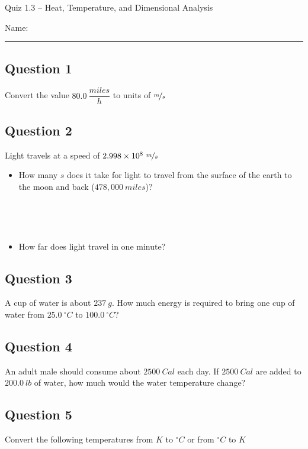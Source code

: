 \documentclass[11pt, letterpaper]{memoir}
\begin{document}
	\begin{center}
		{\large Quiz 1.3 --	Heat, Temperature, and Dimensional Analysis}
	\end{center}
	{\large Name: \rule[-1mm]{4in}{.1pt} 
	\subsection*{Question 1}
	Convert the value $80.0~\dfrac{miles}{h}$ to units of $\nicefrac{m}{s}$ 

\vspace{3em}
\subsection*{Question 2}
Light travels at a speed of $2.998\times10^8~\nicefrac{m}{s}$
\begin{itemize}
	\item How many $s$ does it take for light to travel from the surface of the earth to the moon and back ($478,000~miles$)?
	
	~
	
	~
	
	\item How far does light travel in one minute?
\end{itemize}
	
	\subsection*{Question 3}
	A cup of water is about $237~g$. How much energy is required to bring one cup of water from $25.0~^\circ C$ to $100.0~^\circ C$?
	
	\vspace{3em}
	\subsection*{Question 4}
	An adult male should consume about $2500~Cal$ each day. If $2500~Cal$ are added to $200.0~lb$ of water, how much would the water temperature change?
	
	\vspace{3em}
	\subsection*{Question 5}
	Convert the following temperatures from $K$ to $^\circ C$ or from $^\circ C$ to $K$
	
	
}
\end{document}
